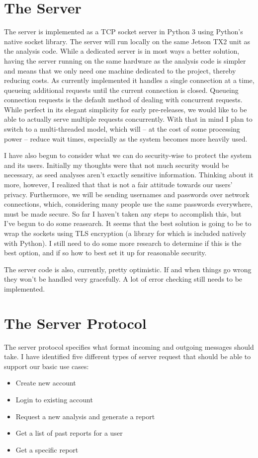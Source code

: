 \documentclass[onecolumn, draftclsnofoot,10pt, compsoc]{IEEEtran}
\begin{document}
\section{The Server}
The server is implemented as a TCP socket server in Python 3 using Python's native socket library.
The server will run locally on the same Jetson TX2 unit as the analysis code.
While a dedicated server is in most ways a better solution, having the server running on the same hardware as the analysis code is simpler and means that we only need one machine dedicated to the project, thereby reducing costs.
As currently implemented it handles a single connection at a time, queueing additional requests until the current connection is closed.
Queueing connection requests is the default method of dealing with concurrent requests.
While perfect in its elegant simplicity for early pre-releases, we would like to be able to actually serve multiple requests concurrently.
With that in mind I plan to switch to a multi-threaded model, which will -- at the cost of some processing power -- reduce wait times, especially as the system becomes more heavily used.

I have also begun to consider what we can do security-wise to protect the system and its users.
Initially my thoughts were that not much security would be necessary, as seed analyses aren't exactly sensitive information.
Thinking about it more, however, I realized that that is not a fair attitude towards our users' privacy.
Furthermore, we will be sending usernames and passwords over network connections, which, considering many people use the same passwords everywhere, must be made secure.
So far I haven't taken any steps to accomplish this, but I've begun to do some reasearch.
It seems that the best solution is going to be to wrap the sockets using TLS encryption (a library for which is included natively with Python).
I still need to do some more research to determine if this is the best option, and if so how to best set it up for reasonable security.

The server code is also, currently, pretty optimistic. If and when things go wrong they won't be handled very gracefully.
A lot of error checking still needs to be implemented.

\section{The Server Protocol}
The server protocol specifies what format incoming and outgoing messages should take.
I have identified five different types of server request that should be able to support our basic use cases:
\begin{itemize}
    \item Create new account
    \item Login to existing account
    \item Request a new analysis and generate a report
    \item Get a list of past reports for a user
    \item Get a specific report
\end{itemize}
\end{document}
